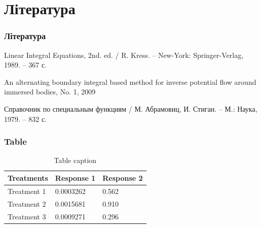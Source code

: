 \documentclass{beamer}
\numberwithin{equation}{section}
\begin{document}
	
\section*{Література}
\begin{frame}
	\thispagestyle{empty}
	\frametitle{Література}
	\begin{thebibliography}{99}
		

		Linear Integral Equations, 2nd. ed. / R. Kress. -- 
		New-York: Springer-Verlag, 1989. -- 367 с.
		
		An alternating boundary integral based method for inverse potential flow around immersed bodies, No. 1, 2009

		Справочник по специальным функциям / М. Абрамовиц, И. Стиган. 
		-- М.: Наука, 1979. -- 832 с.

	\end{thebibliography}
\end{frame}

	
	
	\begin{frame}

		\frametitle{Table}
		\begin{table}
			\begin{tabular}{l l l}
				\toprule
				\textbf{Treatments} & \textbf{Response 1} & \textbf{Response 2}\\
				\midrule
				Treatment 1 & 0.0003262 & 0.562 \\
				Treatment 2 & 0.0015681 & 0.910 \\
				Treatment 3 & 0.0009271 & 0.296 \\
				\bottomrule
			\end{tabular}
			\caption{Table caption}
		\end{table}
	\end{frame}
	
	
\end{document}
